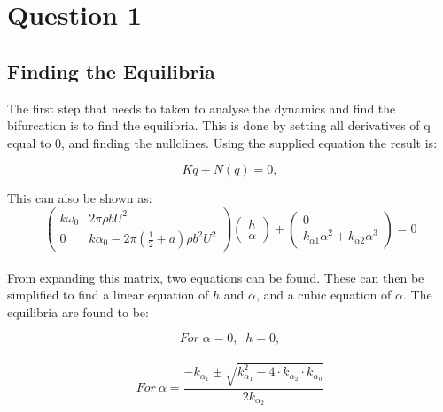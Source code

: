 \section{Question 1}
\subsection{Finding the Equilibria}
\label{sec:equilibria}
The first step that needs to taken to analyse the dynamics and find the bifurcation is to find the equilibria. This is done by setting all derivatives of q equal to 0, and finding the nullclines. Using the supplied equation the result is:

\begin{equation}\label{eq:rootfinder}Kq + N(q) = 0,\end{equation}

\noindent This can also be shown as: \\ 


\begin{equation} \begin{pmatrix}
  k\omega _0 & 2\pi\rho b U^{2} \\
  0 & k\alpha _{0}-2\pi(\frac{1}{2}  + a)\rho b^{2}U^{2}
  \end{pmatrix}
  \begin{pmatrix}
  h \\
  \alpha 
  \end{pmatrix} + 
  \begin{pmatrix}
  0 \\
  k_{\alpha 1}\alpha ^{2} +  k_{\alpha 2}\alpha ^{3}
  \end{pmatrix} = 0
  \label{eq:equilibmatrix}
  \end{equation}\\
  
\noindent From expanding this matrix, two equations can be found. These can then be simplified to find a linear equation of $h$ and $\alpha$, and a cubic equation of $\alpha$. The equilibria are found to be:

\begin{equation}\label{eqn:equilibrium1}
For\; \alpha = 0,  \; \;h = 0, \end{equation}\\
\begin{equation}\label{eqn:equilibrium2}
For \:\alpha = \frac{-k_{\alpha_{1}}\pm \sqrt{k_{\alpha_{1}}^{2} - 4\cdot k_{\alpha_{2}}\cdot k_{\alpha_{0}}}}{2k_{\alpha_{2}}}
\end{equation}

